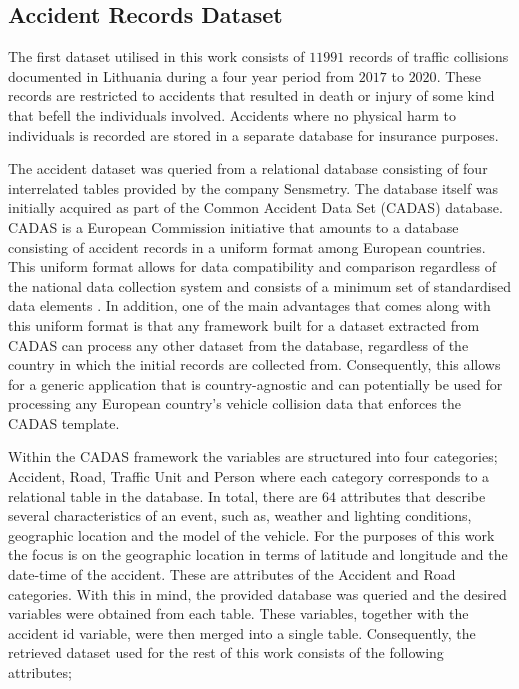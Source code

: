 \documentclass[12pt]{article}
\theoremstyle{definition}
\begin{document}
\subsection{Accident Records Dataset}\label{AccidentRecordsdata set}
The first dataset utilised in this work consists of $11991$ records of traffic collisions documented in Lithuania during a four year period from $2017$ to $2020$. These records are restricted to accidents that resulted in death or injury of some kind that befell the individuals involved. Accidents where no physical harm to individuals is recorded are stored in a separate database for insurance purposes. 

The accident dataset was queried from a relational database consisting of four interrelated tables provided by the company Sensmetry. The database itself was initially acquired as part of the Common Accident Data Set (CADAS) database. CADAS is a European Commission initiative that amounts to a database consisting of accident records in a uniform format among European countries. This uniform format allows for data compatibility and comparison regardless of the national data collection system and consists of a minimum set of standardised data elements \cite{CADAS}. In addition, one of the main advantages that comes along with this uniform format is that any framework built for a dataset extracted from CADAS can process any other dataset from the database, regardless of the country in which the initial records are collected from. Consequently, this allows for a generic application that is country-agnostic and can potentially be used for processing any European country's vehicle collision data that enforces the CADAS template.  

Within the CADAS framework the variables are structured into four categories; Accident, Road, Traffic Unit and Person where each category corresponds to a relational table in the database. In total, there are $64$ attributes that describe several characteristics of an event, such as, weather and lighting conditions, geographic location and the model of the vehicle. For the purposes of this work the focus is on the geographic location in terms of latitude and longitude and the date-time of the accident. These are attributes of the Accident and Road categories. With this in mind, the provided database was queried and the desired variables were obtained from each table. These variables, together with the accident id variable, were then merged into a single table. Consequently, the retrieved dataset used for the rest of this work consists of the following attributes; 
\end{document}
